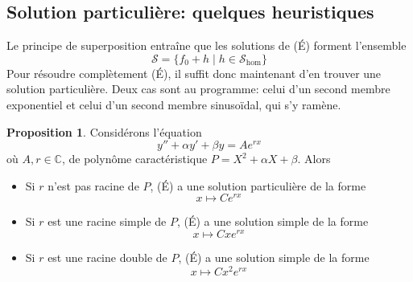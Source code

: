 \documentclass[10pt,a4paper]{article}
\theoremstyle{definition}
\newtheorem{proposition}{Proposition}[section]
\begin{document}
\pagebreak

\subsection{Solution particulière: quelques heuristiques}
\noindent Le principe de superposition entraîne que les solutions de (É) forment l'ensemble
\[ \mathcal{S} = \{ f_0 + h \mid h \in \mathcal{S}_\text{hom} \} \]
Pour résoudre complètement (É), il suffit donc maintenant d'en trouver une solution particulière. Deux cas sont au programme: celui d'un second membre exponentiel et celui d'un second membre sinusoïdal, qui s'y ramène.
\begin{proposition}
Considérons l'équation
\[ y'' + \alpha y' + \beta y = Ae^{rx} \tag{É} \]
où $A, r \in \mathbb{C}$, de polynôme caractéristique $P = X^2 + \alpha X + \beta$. Alors
\begin{itemize}
\item Si $r$ n'est pas racine de $P$, (É) a une solution particulière de la forme
\[ x \mapsto Ce^{rx} \]
\item Si $r$ est une racine simple de $P$, (É) a une solution simple de la forme
\[ x \mapsto Cxe^{rx} \]
\item Si $r$ est une racine double de $P$, (É) a une solution simple de la forme
\[ x \mapsto Cx^2e^{rx} \]
\end{itemize}
\end{proposition}
\end{document}
